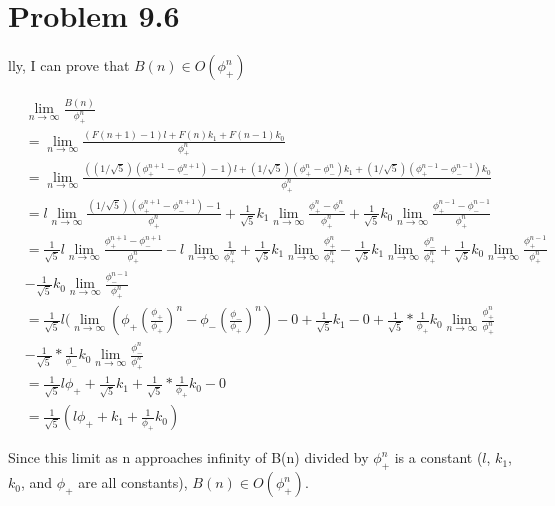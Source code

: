 \documentclass[12pt,letterpaper]{article}
\newcommand\hwnum{9}                  %
\newenvironment{answer}[5]{
  \section*{Problem \hwnum.#1}
}{\newpage}
\begin{document}
\begin{answer}{6}
Finally, I can prove that $B(n) \in O(\phi_+^{n})$

\begin{align*}
&\lim_{n \to \infty} \frac{B(n)}
{\phi_+^{n}}\\
&=\lim_{n \to \infty} \frac{(F(n+1)-1)l + F(n)k_1 + F(n-1)k_0}
{\phi_+^{n}}\\
&=\lim_{n \to \infty} \frac{((1/\sqrt{5})(\phi_+^{n+1}-\phi_-^{n+1})-1)l + (1/\sqrt{5})(\phi_+^{n}-\phi_-^{n})k_1 + (1/\sqrt{5})(\phi_+^{n-1}-\phi_-^{n-1})k_0}
{\phi_+^{n}}\\
&= l\lim_{n \to \infty}\frac{(1/\sqrt{5})(\phi_+^{n+1}-\phi_-^{n+1})-1}{\phi_+^{n}} + 
\frac{1}{\sqrt{5}}k_1\lim_{n \to \infty}\frac{\phi_+^{n}-\phi_-^{n}}{\phi_+^{n}} +
\frac{1}{\sqrt{5}}k_0\lim_{n \to \infty}\frac{\phi_+^{n-1}-\phi_-^{n-1}}{\phi_+^{n}} \\
&= \frac{1}{\sqrt{5}}l\lim_{n \to \infty}\frac{\phi_+^{n+1}-\phi_-^{n+1}}{\phi_+^{n}} -
l\lim_{n \to \infty}\frac{1}{\phi_+^{n}} +
\frac{1}{\sqrt{5}}k_1\lim_{n \to \infty}\frac{\phi_+^{n}}{\phi_+^{n}}-
\frac{1}{\sqrt{5}}k_1\lim_{n \to \infty}\frac{\phi_-^{n}}{\phi_+^{n}} +
\frac{1}{\sqrt{5}}k_0\lim_{n \to \infty}\frac{\phi_+^{n-1}}{\phi_+^{n}} \\&-
\frac{1}{\sqrt{5}}k_0\lim_{n \to \infty}\frac{\phi_-^{n-1}}{\phi_+^{n}}\\
&= \frac{1}{\sqrt{5}}l(\lim_{n \to \infty} 
\left( \phi_+ \left( \frac{\phi_+}{\phi_+}\right)^n - \phi_- \left( \frac{\phi_-}{\phi_+}\right)^n \right) - 0 + \frac{1}{\sqrt{5}}k_1 - 0 + 
\frac{1}{\sqrt{5}}*\frac{1}{\phi_+}k_0\lim_{n \to \infty}\frac{\phi_+^{n}}{\phi_+^{n}} \\&-
\frac{1}{\sqrt{5}}*\frac{1}{\phi_-}k_0\lim_{n \to \infty}\frac{\phi_-^{n}}{\phi_+^{n}}\\
&= \frac{1}{\sqrt{5}}l\phi_+ 
+ \frac{1}{\sqrt{5}}k_1 
+ \frac{1}{\sqrt{5}}*\frac{1}{\phi_+}k_0-0\\
&= \frac{1}{\sqrt{5}}\left(l\phi_+ 
+ k_1 
+ \frac{1}{\phi_+}k_0 \right)
\end{align*}

Since this limit as n approaches infinity of B(n) divided by $\phi_+^n$ is a constant ($l$, $k_1$, $k_0$, and $\phi_+$ are all constants), $B(n) \in O(\phi_+^{n})$.

\end{answer}
\end{document}

